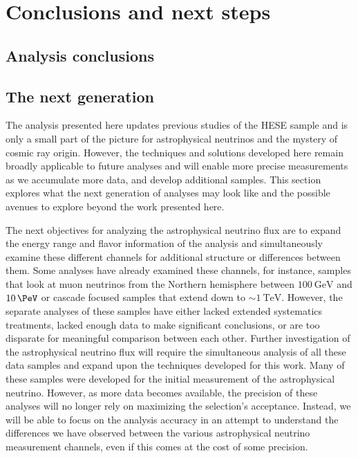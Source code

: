 \chapter{Conclusions and next steps\label{chapter:conclusions}}
\section{Analysis conclusions\label{sec:analysis_conclusions}}
\begingroup
\graphicspath{{results/HESE_Final_Paper/}}

\endgroup
\FloatBarrier

\section{The next generation}
The analysis presented here updates previous studies of the HESE sample and is only a small part of the picture for astrophysical neutrinos and the mystery of cosmic ray origin.
However, the techniques and solutions developed here remain broadly applicable to future analyses and will enable more precise measurements as we accumulate more data, and develop additional samples.
This section explores what the next generation of analyses may look like and the possible avenues to explore beyond the work presented here.

The next objectives for analyzing the astrophysical neutrino flux are to expand the energy range and flavor information of the analysis and simultaneously examine these different channels for additional structure or differences between them.
Some analyses have already examined these channels, for instance, samples that look at muon neutrinos from the Northern hemisphere between $\SI{100}\GeV$ and $\SI{10}\PeV$ or cascade focused samples that extend down to $\sim\SI{1}\TeV$.
However, the separate analyses of these samples have either lacked extended systematics treatments, lacked enough data to make significant conclusions, or are too disparate for meaningful comparison between each other.
Further investigation of the astrophysical neutrino flux will require the simultaneous analysis of all these data samples and expand upon the techniques developed for this work.
Many of these samples were developed for the initial measurement of the astrophysical neutrino.
However, as more data becomes available, the precision of these analyses will no longer rely on maximizing the selection's acceptance.
Instead, we will be able to focus on the analysis accuracy in an attempt to understand the differences we have observed between the various astrophysical neutrino measurement channels, even if this comes at the cost of some precision.

